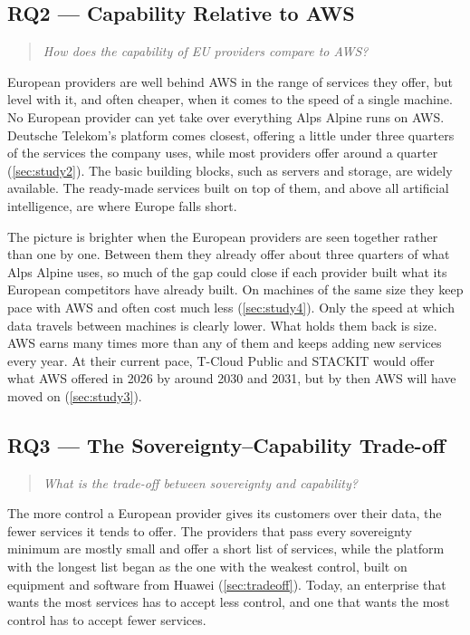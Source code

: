 \subsection{RQ2 --- Capability Relative to AWS}
\label{subsec:rq2}

\begin{quote}
  \itshape How does the capability of EU providers compare to AWS?
\end{quote}

European providers are well behind \acs{AWS} in the range of services they offer,
but level with it, and often cheaper, when it comes to the speed of a single
machine. No European provider can yet take over everything Alps Alpine runs on
\acs{AWS}. Deutsche Telekom's platform comes closest, offering a little under three
quarters of the services the company uses, while most providers offer around a
quarter (\cref{sec:study2}). The basic building blocks, such as servers and
storage, are widely available. The ready-made services built on top of them, and
above all artificial intelligence, are where Europe falls short.

The picture is brighter when the European providers are seen together rather than
one by one. Between them they already offer about three quarters of what Alps
Alpine uses, so much of the gap could close if each provider built what its
European competitors have already built. On machines of the same size they keep
pace with \acs{AWS} and often cost much less (\cref{sec:study4}). Only the speed at
which data travels between machines is clearly lower. What holds them back is
size. \acs{AWS} earns many times more than any of them and keeps adding new
services every year. At their current pace, T-Cloud Public and STACKIT would offer
what \acs{AWS} offered in 2026 by around 2030 and 2031, but by then \acs{AWS} will
have moved on (\cref{sec:study3}).

\subsection{RQ3 --- The Sovereignty--Capability Trade-off}
\label{subsec:rq3}

\begin{quote}
  \itshape What is the trade-off between sovereignty and capability?
\end{quote}

The more control a European provider gives its customers over their data, the
fewer services it tends to offer. The providers that pass every sovereignty
minimum are mostly small and offer a short list of services, while the platform
with the longest list began as the one with the weakest control, built on
equipment and software from Huawei (\cref{sec:tradeoff}). Today, an enterprise
that wants the most services has to accept less control, and one that wants the
most control has to accept fewer services.

